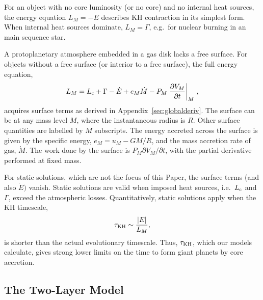 \documentclass[apj, numberedappendix]{emulateapj}
\newcommand{\p}{\partial}
\newcommand{\Eq}[1]{Equation\,(\ref{#1})}
\newcommand{\App}[1]{Appendix~\ref{#1}}
\newcommand{\co}{_{\rm c}}
\begin{document}
For an object with no core luminosity (or no core) and no internal heat sources, the energy equation $L_M = -\dot{E}$ describes KH contraction in its simplest form.  When internal heat sources dominate, $L_M = \Gamma$, e.g.\ for nuclear burning in an main sequence star.

A protoplanetary atmosphere embedded in a gas disk lacks a free surface.  For objects without a free surface (or interior to a free surface), the full energy equation, 
\begin{equation}
\label{eq:coolingglobal}
L_M=L\co+\Gamma-\dot{E}+e_M \dot{M} - P_M \left. \frac{\partial V_M}{\partial t}\right|_M \, ,
\end{equation}
acquires surface terms as derived in  \App{sec:globalderiv}.  The surface can be at any mass level $M$, where the instantaneous radius is $R$.  Other surface quantities are labelled by $M$ subscripts.  The energy accreted across the surface is given by the specific energy, $e_M = u_M-G M/R$, and the mass accretion rate of gas, $\dot{M}$.  The work done by the surface is $P_M \partial V_M/ \partial t$, with the partial derivative performed at fixed mass.  %

For static solutions, which are not the focus of this Paper, the surface terms (and also $\dot{E})$ vanish.  Static solutions are valid when imposed heat sources, i.e.\ $L\co$ and $\Gamma$, exceed the atmospheric losses.  Quantitatively, static solutions apply when the KH timescale,
\begin{equation}
\tau_{\rm KH} \sim {|E| \over L_M}, 
\end{equation} 
is shorter than the actual evolutionary timescale.  Thus, $\tau_{\rm KH}$, which our models calculate, gives strong lower limits on the time to form giant planets by core accretion.


\subsection{The Two-Layer Model} \label{sec:twolayer}
\end{document}
